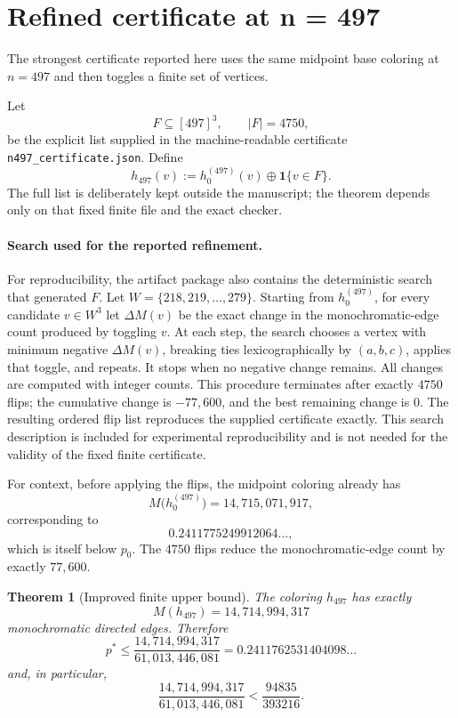 \documentclass[11pt]{article}
\newtheorem{theorem}{Theorem}
\newcommand{\1}{\mathbf{1}}
\begin{document}
\section{Refined certificate at n = 497}

The strongest certificate reported here uses the same midpoint base coloring
at $n = 497$ and then toggles a finite set of vertices.

Let
\[
  F\subseteq[497]^3,
  \qquad |F|=4750,
\]
be the explicit list supplied in the machine-readable certificate
\texttt{n497\_certificate.json}.  Define
\[
  h_{497}(v):=h^{(497)}_0(v)\oplus\1\{v\in F\}.
\]
The full list is deliberately kept outside the manuscript; the theorem
depends only on that fixed finite file and the exact checker.

\paragraph{Search used for the reported refinement.}
For reproducibility, the artifact package also contains the deterministic
search that generated $F$.  Let $W=\{218,219,\ldots,279\}$.  Starting from
$h^{(497)}_0$, for every candidate $v\in W^3$ let $\Delta M(v)$ be the exact
change in the monochromatic-edge count produced by toggling $v$.  At each
step, the search chooses a vertex with minimum negative $\Delta M(v)$,
breaking ties lexicographically by $(a,b,c)$, applies that toggle, and
repeats.  It stops when no negative change remains.  All changes are computed
with integer counts.  This procedure terminates after exactly $4750$ flips;
the cumulative change is $-77{,}600$, and the best remaining change is $0$.
The resulting ordered flip list reproduces the supplied certificate exactly.
This search description is included for experimental reproducibility and is
not needed for the validity of the fixed finite certificate.

For context, before applying the flips, the midpoint coloring already has
\[
  M\bigl(h^{(497)}_0\bigr)=14{,}715{,}071{,}917,
\]
corresponding to
\[
  0.2411775249912064\ldots,
\]
which is itself below $p_0$.  The $4750$ flips reduce the monochromatic-edge
count by exactly $77{,}600$.

\begin{theorem}[Improved finite upper bound]
The coloring $h_{497}$ has exactly
\[
  M(h_{497})=14{,}714{,}994{,}317
\]
monochromatic directed edges.  Therefore
\[
  \boxed{
  p^*\le
  \frac{14{,}714{,}994{,}317}{61{,}013{,}446{,}081}
  =0.2411762531404098\ldots
  }
\]
and, in particular,
\[
  \frac{14{,}714{,}994{,}317}{61{,}013{,}446{,}081}
  <\frac{94835}{393216}.
\]
\end{theorem}
\end{document}

